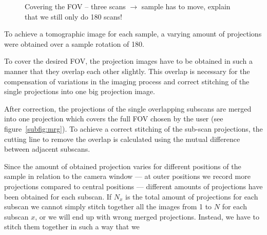 \begin{figure}[tb]
	\centering
	\caption{Covering the FOV -- three scans $\rightarrow$ sample has to move, explain that we still only do \unit{180}{\degree} scans!}
	\label{fig:covering}
\end{figure}

To achieve a tomographic image for each sample, a varying amount of projections were obtained over a sample rotation of \unit{180}{\degree}.




To cover the desired FOV, the projection images have to be obtained in such a manner that they overlap each other slightly. This overlap is necessary for the compensation of variations in the imaging process and correct stitching of the single projections into one big projection image. 

After correction, the projections of the single overlapping subscans are merged into one projection which covers the full FOV chosen by the user (see figure~\ref{subfig:mrg}). To achieve a correct stitching of the sub-scan projections, the cutting line to remove the overlap is calculated using the mutual difference between adjacent subscans.

Since the amount of obtained projection varies for different positions of the sample in relation to the camera window --- at outer positions we record more projections compared to central positions --- different amounts of projections have been obtained for each subscan. If $N_x$ is the total amount of projections for each subscan we cannot simply stitch together all the images from 1 to $N$ for each subscan $x$, or we will end up with wrong merged projections. Instead, we have to stitch them together in such a way that we 



